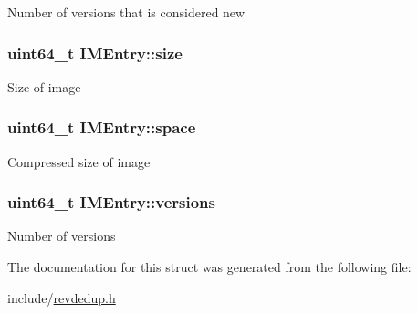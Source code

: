 \-Number of versions that is considered new \hypertarget{structIMEntry_a840792a083a5fea0688ecb8ef81b64ff}{
\subsubsection[{size}]{\setlength{\rightskip}{0pt plus 5cm}uint64\-\_\-t {\bf \-I\-M\-Entry\-::size}}}\label{structIMEntry_a840792a083a5fea0688ecb8ef81b64ff}
\-Size of image \hypertarget{structIMEntry_a07ed875542ea7af03722ec8cfbe0d5ef}{
\subsubsection[{space}]{\setlength{\rightskip}{0pt plus 5cm}uint64\-\_\-t {\bf \-I\-M\-Entry\-::space}}}\label{structIMEntry_a07ed875542ea7af03722ec8cfbe0d5ef}
\-Compressed size of image \hypertarget{structIMEntry_ac8f61be1d9ea807db5b855e67ef596db}{
\subsubsection[{versions}]{\setlength{\rightskip}{0pt plus 5cm}uint64\-\_\-t {\bf \-I\-M\-Entry\-::versions}}}\label{structIMEntry_ac8f61be1d9ea807db5b855e67ef596db}
\-Number of versions 

\-The documentation for this struct was generated from the following file\-:\begin{DoxyCompactItemize}
\item 
include/\hyperlink{revdedup_8h}{revdedup.\-h}\end{DoxyCompactItemize}
